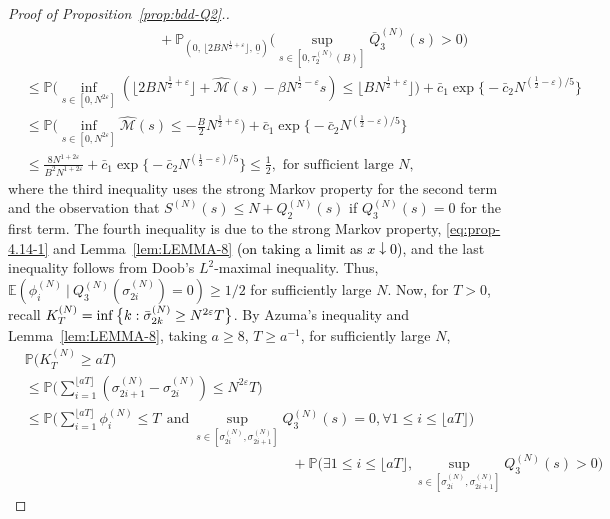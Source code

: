 \documentclass[11pt, reqno]{article}
\numberwithin{equation}{section}
\numberwithin{theorem}{section}
\begin{document}
\begin{proof}[Proof of Proposition~\ref{prop:bdd-Q2}.]
\begin{align*}
    &\hspace{4cm}+\mathbb{P}_{(0, \, \lfloor 2BN^{\frac{1}{2}+\varepsilon} \rfloor, \,\underline{0})}\Big(\sup_{s\in[0,\tau_2^{(N)}(B)]}\bar Q^{(N)}_3(s)>0\Big)\\
    &\leq  \mathbb{P}\Big(\inf_{s\in[0,N^{2\varepsilon}]}(\lfloor2BN^{\frac{1}{2}+\varepsilon}\rfloor +\hat{\mathcal{M}}(s)-\beta N^{\frac{1}{2}-\varepsilon}s)\leq \lfloor BN^{\frac{1}{2}+\varepsilon} \rfloor\Big) 
    +\bar{c}_1\exp \big\{-\bar{c}_2N^{(\frac{1}{2}-\varepsilon)/5}\big\}\\
    &\leq  \mathbb{P}\Big(\inf_{s\in[0,N^{2\varepsilon}]}\hat{\mathcal{M}}(s)\leq -\frac{B}{2}N^{\frac{1}{2}+\varepsilon}\Big)+\bar{c}_1\exp \big\{-\bar{c}_2N^{(\frac{1}{2}-\varepsilon)/5}\big\}\\
    &\leq  \frac{8N^{1+2\varepsilon}}{B^2N^{1+2\varepsilon}}+\bar{c}_1\exp \big\{-\bar{c}_2N^{(\frac{1}{2}-\varepsilon)/5}\big\}\leq \frac{1}{2}, \text{ for sufficient large }N,
\end{align*}
where the third inequality uses the strong Markov property for the second term and the observation that $S^{(N)}(s) \le N + Q_2^{(N)}(s)$ if $Q_3^{(N)}(s)=0$ for the first term. The fourth inequality is due to the strong Markov property, \eqref{eq:prop-4.14-1} and Lemma~\ref{lem:LEMMA-8} \textcolor{black}{(on taking a limit as $x \downarrow 0$)}, and the last inequality follows from Doob's $L^2$-maximal inequality.
Thus, $\mathbb{E}(\phi^{(N)}_i\ |\ Q^{(N)}_3(\sigma^{(N)}_{2i})=0)\geq 1/2$ for sufficiently large $N$.
Now, for $T >0$, recall $K^{(N)}_T=\inf\big\{k:\Bar{\sigma}^{(N)}_{2k}\geq N^{2\varepsilon}T\big\}$.
By Azuma's inequality and Lemma~\ref{lem:LEMMA-8}, taking $a\geq 8$, $T \ge a^{-1}$, for sufficiently large $N$,
\begin{equation*}\label{eq:B2-1}
    \begin{split}
    &\mathbb{P}\Big(K^{(N)}_T\geq aT\Big)\\
    &\leq \mathbb{P}\Big(\sum_{i=1}^{\lfloor aT \rfloor}(\sigma^{(N)}_{2i+1}-\sigma^{(N)}_{2i})\leq N^{2\varepsilon}T\Big)\\
    &\leq  \mathbb{P}\Big(\sum_{i=1}^{\lfloor aT \rfloor}\phi^{(N)}_i
    \leq T\ \ \text{and}\ \sup_{s\in[\sigma^{(N)}_{2i},\sigma^{(N)}_{2i+1}]}Q^{(N)}_3(s)=0,\forall 1\leq i\leq \lfloor aT \rfloor \Big)\\
    &\hspace{8cm}+\mathbb{P}\Big(\exists 1\leq i\leq \lfloor aT \rfloor, \sup_{s\in[\sigma^{(N)}_{2i},\sigma^{(N)}_{2i+1}]}Q^{(N)}_3(s)>0\Big)

\end{split}
\end{equation*}
\end{proof}
\end{document}
